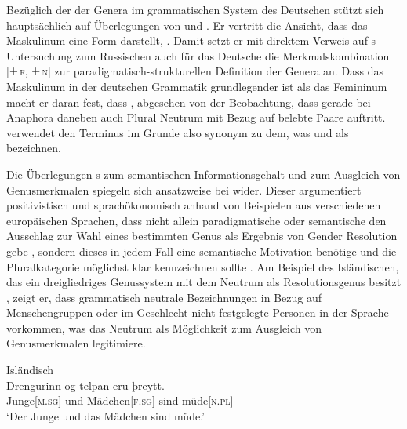Bezüglich der  der Genera im grammatischen System des Deutschen
stützt sich \citet{askedal1973} hauptsächlich auf Überlegungen von
\citet{jakobson1932} und \citet{bierwisch1967}. Er vertritt die Ansicht, dass
das Maskulinum eine  Form darstellt,
. Damit setzt er mit
direktem Verweis auf \citeauthor{jakobson1932}s Untersuchung zum Russischen
auch für das Deutsche die Merkmalskombination [\textsc{±\,f, ±\,n}] zur
paradigmatisch-struktu\-rellen Definition der Genera an. Dass das Maskulinum in
der deutschen Grammatik grundlegender ist als das Femininum macht er daran
fest, dass , abgesehen von der Beobachtung,
dass gerade bei Anaphora daneben auch Plural Neutrum mit Bezug auf belebte
Paare auftritt. \citet{askedal1973} verwendet den Terminus  im
Grunde also synonym zu dem, was \citet[205--218]{corbett1991} und
\citet{wechsler2009} als  bezeichnen.

Die Überlegungen \citeauthor{askedal1973}s zum semantischen Informationsgehalt
und zum Ausgleich von Genusmerkmalen spiegeln sich ansatzweise bei
\citet{corbett1991} wider. Dieser argumentiert positivistisch und
sprachökonomisch anhand von Beispielen aus verschiedenen europäischen Sprachen,
dass nicht allein paradigmatische oder semantische  den
Ausschlag zur Wahl eines bestimmten Genus als Ergebnis von Gender Resolution
gebe \autocite[290--293]{corbett1991}, sondern dieses  in
jedem Fall eine semantische Motivation benötige und die Plural\-kategorie
möglichst klar kennzeichnen sollte \autocite[293--299]{corbett1991}. Am
Beispiel des Isländischen, das ein dreigliedriges Genussystem mit dem Neutrum
als Resolutionsgenus besitzt , zeigt er, dass grammatisch
neutrale Bezeichnungen in Bezug auf Menschen\-gruppen oder im Geschlecht nicht
festgelegte Personen in der Sprache vorkommen, was das Neutrum als Möglichkeit
zum Ausgleich von Genusmerkmalen legiti\-miere.

\begin{exe}
\ex \label{ex:icelgendres}
	\langinfo%
		{Isländisch}%
		{}
		{\cites[nach][283]{corbett1991}[569]{wechsler2009}}\\
	\gll Drengurinn og telpan eru þreytt. \\
		Junge[\textsc{m.sg}] und Mädchen[\textsc{f.sg}] sind
		müde[\textsc{n.pl}] \\
	\trans `Der Junge und das Mädchen sind müde.'
\end{exe}

